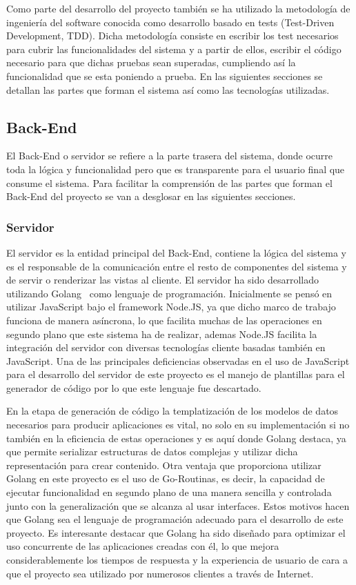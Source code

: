 \documentclass[a4paper,11pt]{book}
\begin{document}
Como parte del desarrollo del proyecto también se ha utilizado la metodología de ingeniería del software conocida como desarrollo basado en tests (Test-Driven Development, TDD). Dicha metodología consiste en escribir los test necesarios para cubrir las funcionalidades del sistema y a partir de ellos, escribir el código necesario para que dichas pruebas sean superadas, cumpliendo así la funcionalidad que se esta poniendo a prueba.  En las siguientes secciones se detallan las partes que forman el sistema así como las tecnologías utilizadas. 

\subsection{Back-End}

El Back-End o servidor se refiere a la parte trasera del sistema, donde ocurre toda la lógica y funcionalidad pero que es transparente para el usuario final que consume el sistema. Para facilitar la comprensión de las partes que forman  el Back-End del proyecto se van a desglosar en las siguientes secciones.

\subsubsection{Servidor}

El servidor es la entidad principal del Back-End, contiene la lógica del sistema y es el responsable de la comunicación entre el resto de componentes del sistema y de servir o renderizar las vistas al cliente. El servidor ha sido desarrollado utilizando Golang~\cite{go} como lenguaje de programación. Inicialmente se pensó en utilizar JavaScript bajo el framework Node.JS, ya que dicho marco de trabajo funciona de manera asíncrona, lo que facilita muchas de las operaciones en segundo plano que este sistema ha de realizar, ademas Node.JS facilita la integración del servidor con diversas tecnologías cliente basadas también en JavaScript. Una de las principales deficiencias  observadas en el uso de JavaScript para el desarrollo del servidor de este proyecto es el manejo de plantillas para el generador de código por lo que este lenguaje fue descartado. 

En la etapa de generación de código la templatización de los modelos de datos necesarios para producir aplicaciones es vital, no solo en su implementación si no también en la eficiencia de estas operaciones y es aquí donde Golang destaca, ya que permite serializar estructuras de datos complejas y utilizar dicha representación para crear contenido. Otra ventaja que proporciona utilizar Golang en este proyecto es el uso de Go-Routinas, es decir, la capacidad de ejecutar funcionalidad en segundo plano de una manera sencilla y controlada junto con la generalización que se alcanza al usar interfaces. Estos motivos hacen que Golang sea el lenguaje de programación adecuado para el desarrollo de este proyecto.  Es interesante destacar que Golang ha sido diseñado para optimizar el uso concurrente de las aplicaciones creadas con él, lo que mejora considerablemente los tiempos de respuesta y la experiencia de usuario de cara a que el proyecto sea utilizado por numerosos clientes a través de Internet.
\end{document}
